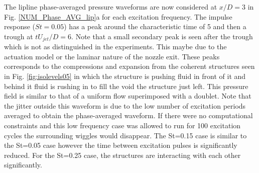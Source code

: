 \documentclass[english]{aiaa-tc}
\begin{document}
The lipline phase-averaged pressure waveforms are now considered at $x/D=3$ in Fig. \ref{NUM_Phase_AVG_lip}a for each excitation frequency. The impulse response ($St=0.05$) has a peak around the characteristic time of 5 and then a trough at $tU_{jet}/D=6$. Note that a small secondary peak is seen after the trough which is not as distinguished in the experiments. This maybe due to the actuation model or the laminar nature of the nozzle exit.
These peaks corresponds to the compressions and expansion from the coherent structures seen in Fig. \ref{fig:isolevels05} in which the structure is pushing fluid in front of it and behind it fluid is rushing in to fill the void the structure just left. This pressure field is similar to that of a uniform flow superimposed with a doublet. Note that the jitter outside this waveform is due to the low number of excitation periods averaged to obtain the phase-averaged waveform. If there were no computational constraints and this low frequency case was allowed to run for 100 excitation cycles the surrounding wiggles would disappear. The St=0.15 case is similar to  the St=0.05 case however the time between excitation pulses is significantly reduced. For the St=0.25 case, the structures are interacting with each other significantly. 
\end{document}

